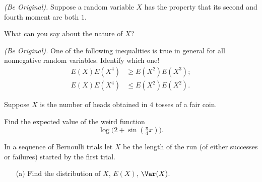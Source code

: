 \begin{problem}[Handout 7, \# 13]
  \emph{(Be Original).} Suppose a random variable \(X\) has the property
  that its second and fourth moment are both \(1\).

  What can you say about the nature of \(X\)?
\end{problem}
\begin{solution}

\end{solution}
\newpage

\begin{problem}[Handout 7, \# 14]
  \emph{(Be Original).} One of the following inequalities is true in
  general for all nonnegative random variables. Identify which one!
  \begin{align*}
    E(X)E(X^4)&\geq E(X^2)E(X^3);\\
    E(X)E(X^4)&\leq E(X^2)E(X^2).
  \end{align*}
\end{problem}
\begin{solution}

\end{solution}
\newpage

\begin{problem}[Handout 7, \# 15]
  Suppose \(X\) is the number of heads obtained in \(4\) tosses of a fair
  coin.

  Find the expected value of the weird function
  \[
    \log\bigl( 2+\sin(\tfrac{\pi}{4}x) \bigr).
  \]
\end{problem}
\begin{solution}

\end{solution}
\newpage

\begin{problem}[Handout 7, \# 16]
  In a sequence of Bernoulli trials let \(X\) be the length of the run (of
  either successes or failures) started by the first trial.
  \begin{itemize}[noitemsep]
  \item[(a)] Find the distribution of \(X\), \(E(X)\), \(\Var(X)\).
  \end{itemize}
\end{problem}
\begin{solution}

\end{solution}
\newpage

